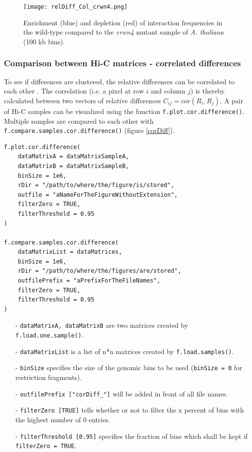 \documentclass[a4paper,10pt]{article}
\begin{document}
\clearpage
\begin{figure}[!ht]
\begin{center}
\centering
\texttt{[image: relDiff\_Col\_crwn4.png]}
\end{center}
\caption{Enrichment (blue) and depletion (red) of interaction frequencies in the wild-type compared to the \textit{crwn4} mutant sample of \textit{A. thaliana} \cite{2014_Grob} (100 kb bins).}
\label{relDiff}
\end{figure}
\clearpage
\subsubsection{Comparison between Hi-C matrices - correlated differences}
To see if differences are clustered, the relative differences can be correlated to each other \cite{2014_Grob}. The correlation (i.e. a pixel at row $i$ and column $j$) is thereby calculated between two vectors of relative differences $C_{ij} = cor(R_{i},R_{j})$. A pair of Hi-C samples can be visualized using the function \texttt{f.plot.cor.difference()}. Multiple samples are compared to each other with \texttt{f.compare.samples.cor.difference()} (figure \ref{corDiff}).
\begin{verbatim}
f.plot.cor.difference(
    dataMatrixA = dataMatrixSampleA,
    dataMatrixB = dataMatrixSampleB,
    binSize = 1e6,
    rDir = "/path/to/where/the/figure/is/stored",
    outfile = "aNameForTheFigureWithoutExtension",
    filterZero = TRUE,
    filterThreshold = 0.95
)

f.compare.samples.cor.difference(
    dataMatrixList = dataMatrices,
    binSize = 1e6,
    rDir = "/path/to/where/the/figures/are/stored",
    outfilePrefix = "aPrefixForTheFileNames",
    filterZero = TRUE,
    filterThreshold = 0.95
)
\end{verbatim}
\begin{itemize}
 \item[-] \texttt{dataMatrixA, dataMatrixB} are two matrices created by \texttt{f.load.one.sample()}.
 \item[-] \texttt{dataMatrixList} is a list of n*n matrices created by \texttt{f.load.samples()}. 
 \item[-] \texttt{binSize} specifies the size of the genomic bins to be used (\texttt{binSize = 0} for restriction fragments).
 \item[-] \texttt{outfilePrefix ["corDiff\_"]} will be added in front of all file names.
 \item[-] \texttt{filterZero [TRUE]} tells whether or not to filter the x percent of bins with the highest number of 0 entries.
 \item[-] \texttt{filterThreshold [0.95]} specifies the fraction of bins which shall be kept if \texttt{filterZero = TRUE}.
\end{itemize}
\end{document}
